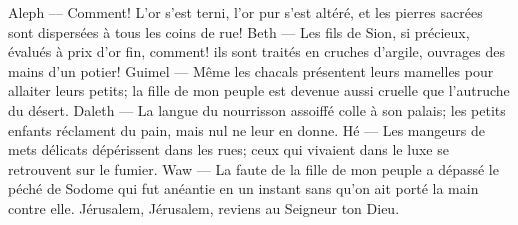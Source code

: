 Aleph --- Comment! L’or s’est terni, l’or pur s’est altéré,
	et les pierres sacrées sont dispersées à tous les coins de rue!
Beth --- Les fils de Sion, si précieux, évalués à prix d’or fin, comment!
	ils sont traités en cruches d’argile, ouvrages des mains d’un potier!
Guimel --- Même les chacals présentent leurs mamelles pour allaiter leurs petits;
	la fille de mon peuple est devenue aussi cruelle que l’autruche du désert.
Daleth --- La langue du nourrisson assoiffé colle à son palais;
	les petits enfants réclament du pain, mais nul ne leur en donne.
Hé --- Les mangeurs de mets délicats dépérissent dans les rues;
	ceux qui vivaient dans le luxe se retrouvent sur le fumier.
Waw --- La faute de la fille de mon peuple a dépassé le péché de Sodome
	qui fut anéantie en un instant sans qu’on ait porté la main contre elle.
Jérusalem, Jérusalem, reviens au Seigneur ton Dieu.
